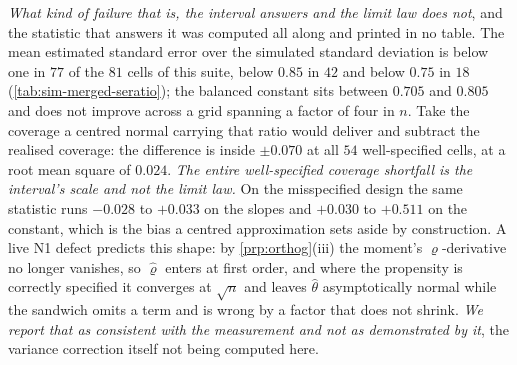 \documentclass[
  12pt]{article}
\newcommand{\1}[1]{\mathds{1}\left[#1\right]}
\theoremstyle{plain}
\theoremstyle{definition}
\theoremstyle{definition}
\theoremstyle{remark}
\begin{document}
\emph{What kind of failure that is, the interval answers and the limit law does not},
and the statistic that answers it was computed all along and printed in no table.
The mean estimated standard error over the simulated standard deviation is below
one in $77$ of the $81$ cells of this suite, below $0.85$ in $42$ and below
$0.75$ in $18$ (\cref{tab:sim-merged-seratio}); the balanced constant sits
between $0.705$ and $0.805$ and does not improve across a grid spanning a factor
of four in $n$. Take the coverage a centred normal carrying that ratio would
deliver and subtract the realised coverage: the difference is inside $\pm0.070$
at all $54$ well-specified cells, at a root mean square of $0.024$. \emph{The entire
well-specified coverage shortfall is the interval's scale and not the limit
law.} On the misspecified design the same statistic runs $-0.028$ to $+0.033$ on
the slopes and $+0.030$ to $+0.511$ on the constant, which is the bias a centred
approximation sets aside by construction. A live N1 defect predicts this
shape: by \cref{prp:orthog}(iii) the moment's $\varrho$-derivative no longer
vanishes, so $\hat\varrho$ enters at first order, and where the propensity is
correctly specified it converges at $\sqrt n$ and leaves $\hat\theta$
asymptotically normal while the sandwich omits a term and is wrong by a factor
that does not shrink. \emph{We report that as consistent with the measurement and not
as demonstrated by it}, the variance correction itself not being computed here.
\end{document}
